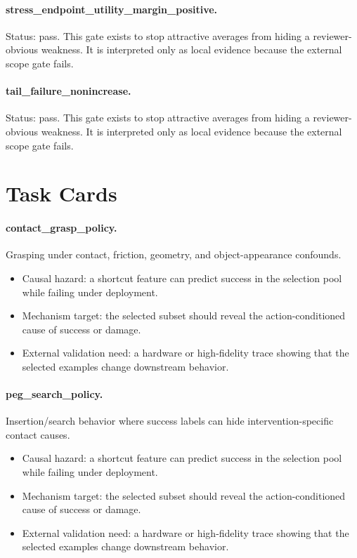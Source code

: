 \documentclass{article}
\begin{document}
\paragraph{stress\_endpoint\_utility\_margin\_positive.} Status: pass. This gate exists to stop attractive averages from hiding a reviewer-obvious weakness. It is interpreted only as local evidence because the external scope gate fails.
\paragraph{tail\_failure\_nonincrease.} Status: pass. This gate exists to stop attractive averages from hiding a reviewer-obvious weakness. It is interpreted only as local evidence because the external scope gate fails.
\section{Task Cards}
\paragraph{contact\_grasp\_policy.} Grasping under contact, friction, geometry, and object-appearance confounds.
\begin{itemize}
\item Causal hazard: a shortcut feature can predict success in the selection pool while failing under deployment.
\item Mechanism target: the selected subset should reveal the action-conditioned cause of success or damage.
\item External validation need: a hardware or high-fidelity trace showing that the selected examples change downstream behavior.
\end{itemize}
\paragraph{peg\_search\_policy.} Insertion/search behavior where success labels can hide intervention-specific contact causes.
\begin{itemize}
\item Causal hazard: a shortcut feature can predict success in the selection pool while failing under deployment.
\item Mechanism target: the selected subset should reveal the action-conditioned cause of success or damage.
\item External validation need: a hardware or high-fidelity trace showing that the selected examples change downstream behavior.
\end{itemize}
\end{document}
